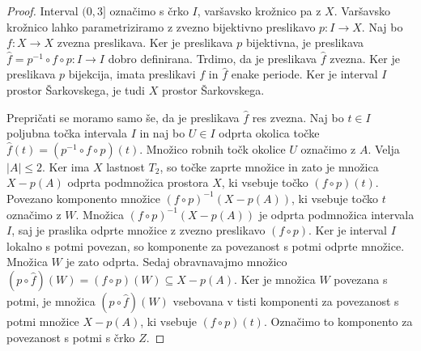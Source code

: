 \documentclass[../TG_magistrsko_delo_sections.tex]{subfiles}
\begin{document}
\begin{proof}
Interval $(0, 3]$ označimo s črko $I$, varšavsko krožnico pa z $X$. Varšavsko krožnico lahko parametriziramo z zvezno bijektivno preslikavo $p:I \to X$. Naj bo $f: X \to X$ zvezna preslikava. Ker je preslikava $p$ bijektivna, je preslikava $\widehat{f} = p^{-1} \circ f \circ p : I \to I$ dobro definirana. Trdimo, da je preslikava $\widehat{f}$ zvezna. Ker je preslikava $p$ bijekcija, imata preslikavi $f$ in $\widehat{f}$ enake periode. Ker je interval $I$ prostor Šarkovskega, je tudi $X$ prostor Šarkovskega. 

Prepričati se moramo samo še, da je preslikava $\widehat{f}$ res zvezna. Naj bo $t \in I$ poljubna točka intervala $I$ in naj bo $U \in I$ odprta okolica točke $\widehat{f}(t) = (p^{-1} \circ f \circ p)(t)$. Množico robnih točk okolice $U$ označimo z $A$. Velja $|A| \leq 2$. Ker ima $X$ lastnost $T_2$, so točke zaprte množice in zato je množica $X - p(A)$ odprta podmnožica prostora $X$, ki vsebuje točko $(f \circ p)(t)$. Povezano komponento množice $(f \circ p)^{-1}(X-p(A))$, ki vsebuje točko $t$ označimo z $W$. Množica $(f \circ p)^{-1}(X-p(A))$ je odprta podmnožica intervala $I$, saj je praslika odprte množice z zvezno preslikavo $(f \circ p)$. Ker je interval $I$ lokalno s potmi povezan, so komponente za povezanost s potmi odprte množice. Množica $W$ je zato odprta. Sedaj obravnavajmo množico $\left(p \circ \widehat{f}\right) (W) = (f \circ p)(W) \subseteq X - p(A)$. Ker je množica $W$ povezana s potmi, je množica $\left(p \circ \widehat{f} \right) (W)$ vsebovana v tisti komponenti za povezanost s potmi množice $X-p(A)$, ki vsebuje $(f \circ p)(t)$. Označimo to komponento za povezanost s potmi s črko $Z$. 


\end{proof}
\end{document}
